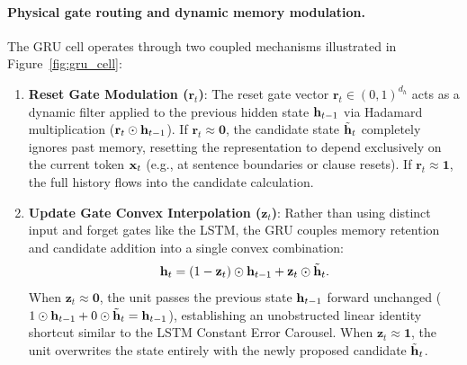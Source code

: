 \documentclass[../../main.tex]{subfiles}
\begin{document}
\paragraph{Physical gate routing and dynamic memory modulation.}
The GRU cell operates through two coupled mechanisms illustrated in Figure~\ref{fig:gru_cell}:
\begin{enumerate}
    \item \textbf{Reset Gate Modulation ($\mathbf{r}_t$)}: The reset gate vector $\mathbf{r}_t \in (0, 1)^{d_h}$ acts as a dynamic filter applied to the previous hidden state $\mathbf{h}_{t-1}$ via Hadamard multiplication ($\mathbf{r}_t \odot \mathbf{h}_{t-1}$). If $\mathbf{r}_t \approx \mathbf{0}$, the candidate state $\tilde{\mathbf{h}}_t$ completely ignores past memory, resetting the representation to depend exclusively on the current token $\mathbf{x}_t$ (e.g., at sentence boundaries or clause resets). If $\mathbf{r}_t \approx \mathbf{1}$, the full history flows into the candidate calculation.
    \item \textbf{Update Gate Convex Interpolation ($\mathbf{z}_t$)}: Rather than using distinct input and forget gates like the LSTM, the GRU couples memory retention and candidate addition into a single convex combination:
    \[
    \mathbf{h}_t = (1 - \mathbf{z}_t) \odot \mathbf{h}_{t-1} + \mathbf{z}_t \odot \tilde{\mathbf{h}}_t.
    \]
    When $\mathbf{z}_t \approx \mathbf{0}$, the unit passes the previous state $\mathbf{h}_{t-1}$ forward unchanged ($1 \odot \mathbf{h}_{t-1} + 0 \odot \tilde{\mathbf{h}}_t = \mathbf{h}_{t-1}$), establishing an unobstructed linear identity shortcut similar to the LSTM Constant Error Carousel. When $\mathbf{z}_t \approx \mathbf{1}$, the unit overwrites the state entirely with the newly proposed candidate $\tilde{\mathbf{h}}_t$.
\end{enumerate}
\end{document}
